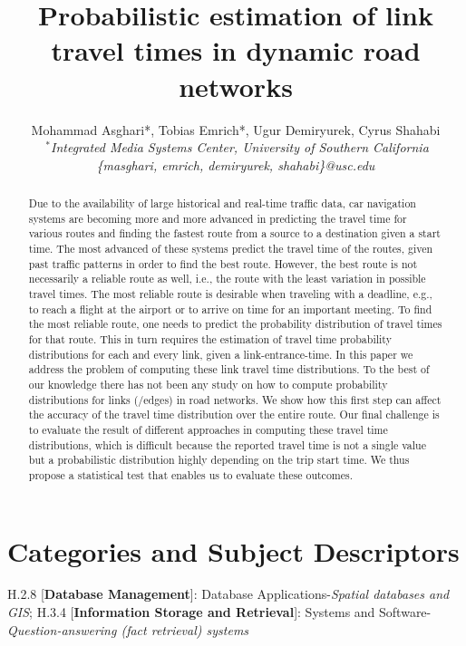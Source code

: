 \documentclass[]{sig-alternate}
\title{Probabilistic estimation of link travel times in dynamic road networks}
\author{{Mohammad Asghari*, Tobias Emrich*, Ugur Demiryurek, Cyrus Shahabi}
  \vspace{1.6mm}\\
  \fontsize{10}{10}\selectfont\rmfamily\itshape
  $~^{*}$Integrated Media Systems Center, University of Southern California\\
  \fontsize{9}{9}\selectfont\ttfamily\upshape
  \{masghari, emrich, demiryurek, shahabi\}@usc.edu
}
\begin{document}
\maketitle

\begin{abstract}

Due to the availability of large historical and real-time traffic data, car navigation systems are becoming more and more advanced in predicting the travel time for various routes and finding the fastest route from a source to a destination given a start time.  The most advanced of these systems predict the travel time of the routes, given past traffic patterns in order to find the best route. However, the best route is not necessarily a reliable route as well, i.e., the route with the least variation in possible travel times. The most reliable route is desirable when traveling with a deadline, e.g., to reach a flight at the airport or to arrive on time for an important meeting.  To find the most reliable route, one needs to predict the probability distribution of travel times for that route. This in turn requires the estimation of travel time probability distributions for each and every link, given a link-entrance-time. In this paper we address the problem of computing these link travel time distributions. To the best of our knowledge there has not been any study on how to compute probability distributions for links (/edges) in road networks. We show how this first step can affect the accuracy of the travel time distribution over the entire route. Our final challenge is to evaluate the result of different approaches in computing these travel time distributions, which is difficult because the reported travel time is not a single value but a probabilistic distribution highly depending on the trip start time.  We thus propose a statistical test that enables us to evaluate these outcomes.
\end{abstract}
\vspace{-0.15in}
\section*{Categories and Subject Descriptors}
\vspace{-0.025in}
H.2.8 [\textbf{Database Management}]: Database Applications-\textit{Spatial databases and GIS}; H.3.4 [\textbf{Information Storage and Retrieval}]: Systems and Software-\textit{Question-answering (fact retrieval) systems}

\vspace{-0.1in}
\end{document}
